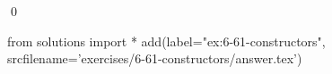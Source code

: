
\begin{ex}
  \label{ex:6-61-constructors}
  
  \qed
\end{ex}
\begin{python0}
from solutions import *
add(label="ex:6-61-constructors",
    srcfilename='exercises/6-61-constructors/answer.tex')
\end{python0}
